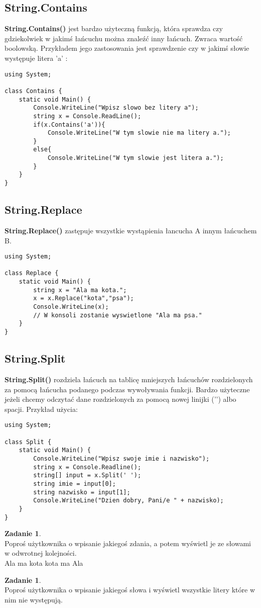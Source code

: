 \documentclass[a4paper]{article}
\theoremstyle{definition}
\newtheorem{zadanie}[theorem]{Zadanie}
\begin{document}
\subsection{String.Contains}
\textbf{String.Contains()} jest bardzo użyteczną funkcją, która sprawdza czy gdziekolwiek w jakimś łańcuchu można znaleźć inny łańcuch. Zwraca wartość boolowską. Przykładem jego zastosowania jest sprawdzenie czy w jakimś słowie występuje litera 'a' :\\
\begin{lstlisting}[frame=single]
using System;

class Contains {
    static void Main() {
    	Console.WriteLine("Wpisz slowo bez litery a");
        string x = Console.ReadLine();
        if(x.Contains('a')){
        	Console.WriteLine("W tym slowie nie ma litery a.");
        }
        else{
        	Console.WriteLine("W tym slowie jest litera a.");
        }
    }
}
\end{lstlisting}
\subsection{String.Replace}
\textbf{String.Replace()} zastępuje wszystkie wystąpienia łancucha A innym łańcuchem B.\\
\begin{lstlisting}[frame=single]
using System;

class Replace {
    static void Main() {
        string x = "Ala ma kota.";
        x = x.Replace("kota","psa");
        Console.WriteLine(x);
        // W konsoli zostanie wyswietlone "Ala ma psa."
    }
}
\end{lstlisting}
\subsection{String.Split}
\textbf{String.Split()} rozdziela łańcuch na tablicę mniejszych łańcuchów rozdzielonych za pomocą łańcucha podanego podczas wywoływania funkcji. Bardzo użyteczne jeżeli chcemy odczytać dane rozdzielonych za pomocą nowej linijki ('\n') albo spacji. Przykład użycia:\\
\begin{lstlisting}[frame=single]
using System;

class Split {
    static void Main() {
        Console.WriteLine("Wpisz swoje imie i nazwisko");
        string x = Console.Readline();
        string[] input = x.Split(' ');
        string imie = input[0];
        string nazwisko = input[1];
        Console.WriteLine("Dzien dobry, Pani/e " + nazwisko);
    }
}
\end{lstlisting}
\begin{zadanie}
\\Poproś użytkownika o wpisanie jakiegoś zdania, a potem wyświetl je ze słowami w odwrotnej kolejności.
\\\textrm{Ala ma kota \rightarrow \textrm{kota  ma  Ala}}
\end{zadanie}
\begin{zadanie}
\\Poproś użytkownika o wpisanie jakiegoś słowa i wyświetl wszystkie litery które w nim nie występują.
\end{zadanie}
\pagebreak
\end{document}
